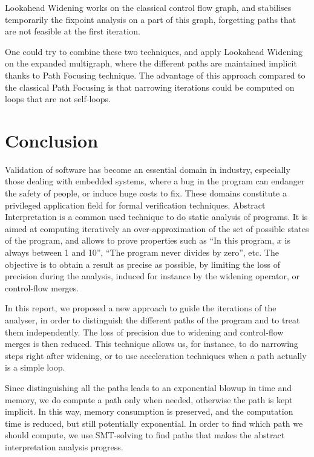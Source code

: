 \documentclass[a4paper,english,titlepage,11pt]{report}
\begin{document}
	Lookahead Widening works on the classical control flow graph, and stabilises
	temporarily the fixpoint analysis on a part of this graph, forgetting paths
	that are not feasible at the first iteration.

	One could try to combine these two techniques, and apply Lookahead Widening
	on the expanded multigraph, where the different paths are maintained
	implicit thanks to Path Focusing technique. The advantage of this approach
	compared to the classical Path Focusing is that narrowing iterations could
	be computed on loops that are not self-loops.

\chapter{Conclusion}
  
	Validation of software has become an essential domain in industry,
	especially those dealing with embedded systems, where a bug in the program
	can endanger the safety of people, or induce huge costs to fix. These
	domains constitute a privileged application field for formal verification
	techniques.
	Abstract Interpretation is a common used technique to do static analysis of
	programs. It is aimed at computing iteratively an over-approximation of the set of
	possible states of the program, and allows to prove properties such as
	``In this program, $x$ is always between 1 and 10'', ``The program never
	divides by zero'', etc. The objective is to obtain a result as precise as
	possible, by limiting the loss of precision during the analysis, induced for
	instance by the widening operator, or control-flow merges.

	In this report, we proposed a new approach to guide the iterations of the
	analyser, in order to distinguish the different paths of the program
	and to treat them
	independently. The loss of precision due to widening and control-flow merges
	is then reduced. This technique allows us, for instance, to do narrowing
	steps right after widening, or to use acceleration techniques when a path
	actually is a simple loop.

	Since distinguishing all the paths leads to an exponential blowup in time
	and memory, we do compute a path only when needed, otherwise the path is
	kept implicit. In this way, memory consumption is preserved, and the
	computation time is reduced, but still potentially exponential.
	In order to find which path we should compute, we use SMT-solving to find
	paths that makes the abstract interpretation analysis progress.
\end{document}
